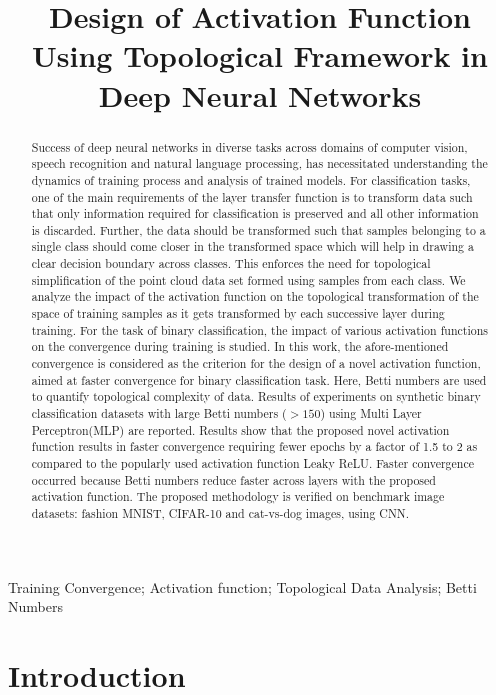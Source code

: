 \documentclass[wcp]{jmlr}
\title[Topological Framework for new activation function  design DNN]{Design of Activation Function Using Topological Framework  in Deep Neural Networks}
\begin{document}
\maketitle

\begin{abstract}
Success of deep neural networks in diverse tasks across domains of computer vision, speech recognition and natural language processing, has necessitated understanding the dynamics of training process and analysis of trained models. For classification tasks, one of the main requirements of the layer transfer function is to transform data such that only information required for classification is preserved and all other information is discarded.  Further, the data should be transformed such that samples belonging to a single class should come closer in the transformed space which will help in drawing a clear decision boundary across classes. This enforces the need for topological simplification of the point cloud data set formed using samples from each class. We analyze the impact of the activation function on the topological transformation of the space of training samples as it gets transformed by each successive layer during training. For the task of binary classification, the impact of various activation functions on the convergence during training is studied.  In this work, the afore-mentioned convergence is considered as the criterion for the design of a novel activation function, aimed at faster convergence for binary classification task.  Here, Betti numbers are used to quantify topological complexity of data. Results of experiments on synthetic binary classification datasets with large Betti numbers ($>150$) using Multi Layer Perceptron(MLP) are reported. Results show that the proposed novel activation function results in faster convergence requiring fewer epochs by a factor of 1.5  to 2 as compared to the popularly used activation function Leaky ReLU. Faster convergence occurred because Betti numbers reduce faster across layers with the proposed activation function. The proposed methodology is verified on benchmark image datasets: fashion MNIST, CIFAR-10 and cat-vs-dog images, using CNN.
\end{abstract}
\begin{keywords}
Training Convergence; Activation function; Topological Data Analysis; Betti Numbers
\end{keywords}

\section{Introduction}
\end{document}
